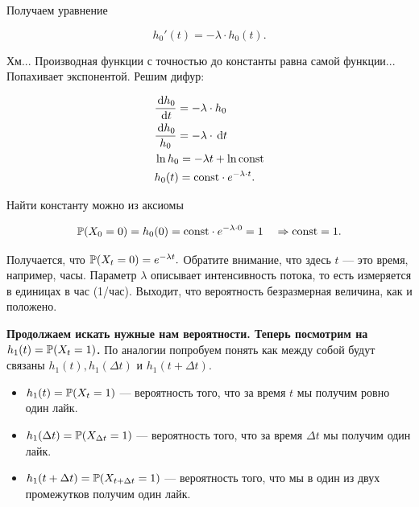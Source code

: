 \documentclass[12pt, a4paper, oneside]{article}
\begin{document}
Получаем уравнение 

\[
h_0'(t) = -\lambda \cdot h_0(t).
\]

Хм... Производная функции с точностью до константы равна самой функции... Попахивает экспонентой. Решим дифур: 

\begin{equation*}
\begin{aligned} 
    & \frac{\,\mathrm{d}h_0}{\,\mathrm{d}t} = -\lambda \cdot h_0 \\
    & \frac{\,\mathrm{d}h_0}{h_0} = -\lambda \cdot \,\mathrm{d}t \\
    & \ln h_0 = -\lambda t + \ln \mathrm{const} \\
    & h_0(t) = \mathrm{const} \cdot e^{-\lambda \cdot t}. \\
\end{aligned}
\end{equation*}

Найти константу можно из аксиомы  

\[
\mathbb{P}(X_0 = 0) = h_0(0) = \mathrm{const} \cdot e^{-\lambda \cdot 0} = 1 \quad \Rightarrow \mathrm{const} = 1.
\]

Получается, что $\mathbb{P}(X_t = 0) = e^{-\lambda t}.$ Обратите внимание, что здесь $t$ --- это время, например, часы. Параметр $\lambda$ описывает интенсивность потока, то есть измеряется в единицах в час (1/час). Выходит, что вероятность безразмерная величина, как и положено. 

\textbf{Продолжаем искать нужные нам вероятности. Теперь посмотрим на $h_1(t) = \mathbb{P}(X_t = 1)$.} По аналогии попробуем понять как между собой будут связаны $h_1(t), h_1(\Delta t)$ и $h_1(t + \Delta t)$. 

\begin{itemize} 
\item  $h_1(t) = \mathbb{P}(X_t = 1)$ --- вероятность того, что за время $t$ мы получим ровно один лайк. 

\item $h_1(\Delta t) = \mathbb{P}(X_{\Delta t} = 1)$ --- вероятность того, что за время $\Delta t$ мы получим  один лайк. 

\item $h_1(t + \Delta t) = \mathbb{P}(X_{t + \Delta t} = 1)$ --- вероятность того, что мы в один из двух промежутков получим один лайк. 
\end{itemize} 

\begin{center} 
\end{center} 
\end{document}
